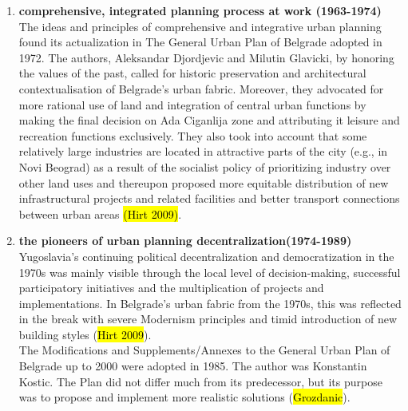 \documentclass[11pt]{report}
\begin{document}
\begin{enumerate}
\item \textbf{comprehensive, integrated planning process at work (1963-1974)}
\\
The ideas and principles of comprehensive and integrative urban planning found its actualization in The  General  Urban  Plan  of  Belgrade  adopted in 1972.
The authors, Aleksandar Djordjevic and Milutin Glavicki, by honoring the values of the past, called for historic preservation and architectural contextualisation of Belgrade's urban fabric.
Moreover, they advocated for more  rational  use  of  land  and integration of central urban functions by making the final decision on Ada Ciganlija zone and attributing it leisure and recreation functions exclusively. They also took into account that some relatively large industries are located in attractive parts of the city (e.g., in Novi Beograd) as a result of the socialist policy of prioritizing industry over other land uses and thereupon proposed more equitable distribution of new infrastructural projects and related  facilities and better  transport connections between urban areas \hl{(Hirt 2009)}.

\item \textbf{the pioneers of urban planning decentralization(1974-1989)}
\\
Yugoslavia’s continuing political decentralization and democratization in the 1970s was mainly visible through the local level of decision-making, successful participatory initiatives and the multiplication of projects and implementations. In Belgrade’s urban fabric from the 1970s, this was reflected in the break with severe Modernism principles and timid introduction of new building styles (\hl{Hirt 2009}).
\\
The Modifications  and  Supplements/Annexes  to  the  General  Urban  Plan  of  Belgrade  up  to 2000 were adopted in 1985. The author was Konstantin Kostic.
The Plan did not differ much from its predecessor, but its purpose was to propose and implement more realistic solutions (\hl{Grozdanic}).
\end{enumerate}
 
\end{document}

